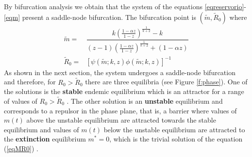 \documentclass[eng]{MMSB-class-eng}
\begin{document}
By bifurcation analysis we obtain that the system of the  equations 
\eqref{eqreservorio}-\eqref{eqm}
present a saddle-node bifurcation.
The bifurcation point is $(\tilde m,\tilde R_0)$ where 
\begin{equation}\label{meq}
\begin{split}
\tilde m=&\dfrac{k\left( \frac{1-\alpha z}{1-z}\right)^{\frac{1}{k+2}} - k}{(z-1)\left( \frac{1-\alpha z}{1-z}\right)^{\frac{1}{k+2}} + (1-\alpha z)}\\
\tilde R_0=&\left[ \psi(\tilde m;k,z)\phi(\tilde m;k,z)\right]^{-1}
\end{split}	
\end{equation}
As shown in the next section, the system undergoes a saddle-node bifurcation and therefore, for  $R_0> \tilde R_0 $ there are three equilibria
(see Figure \ref{f:phase}). 
One of the solutions is the \textbf{stable}  endemic equilibrium %
which is an attractor for a range of values of $R_0> \tilde R_0 $ .
The other solution is an \textbf{unstable} equilibrium and corresponds to a repulsor in the phase plane, that is, a barrier where values of $m(t)$ above the unstable equilibrium are attracted towards the stable equilibrium and values of $m (t)$ below the unstable equilibrium are attracted to the \textbf{extinction} equilibrium $m^*= 0$, which is the trivial solution of the equation (\ref{eqMR0}) .
\end{document}
